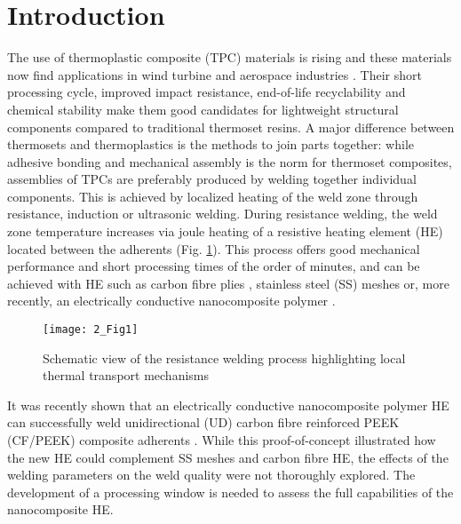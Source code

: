 \section{Introduction}

The use of thermoplastic composite (TPC) materials is rising \cite{Mathijsen2016} and these materials now find applications in wind turbine and aerospace industries \cite{Penumadu2019}. 
Their short processing cycle, improved impact resistance, end-of-life recyclability and chemical stability \cite{cogswell1992} make them good candidates for lightweight structural components compared to traditional thermoset resins. 
A major difference between thermosets and thermoplastics is the methods to join parts together: while adhesive bonding and mechanical assembly is the norm for thermoset composites, assemblies of TPCs are preferably produced by welding together individual components. 
This is achieved by localized heating of the weld zone through resistance, induction or ultrasonic welding. 
During resistance welding, the weld zone temperature increases via joule heating of a resistive heating element (HE) located between the adherents \cite{Ageorges2001a,Stavrov2005a,Dube2007c,Shi2014,Brassard2019a,Eveno1988} (Fig. \ref{fig:2_Fig1}). 
This process offers good mechanical performance and short processing times of the order of minutes, and can be achieved with HE such as carbon fibre plies \cite{Eveno1988}, stainless steel (SS) meshes \cite{Stavrov2005a,Dube2007c,Shi2014} or, more recently, an electrically conductive nanocomposite polymer \cite{Brassard2019a}. 

\begin{figure}[ht]
	\center
	\texttt{[image: 2\_Fig1]}
	\caption{Schematic view of the resistance welding process highlighting local thermal transport mechanisms \cite{Brassard2019b}}
	\label{fig:2_Fig1}
\end{figure} 

It was recently shown that an electrically conductive nanocomposite polymer HE can successfully weld unidirectional (UD) carbon fibre reinforced PEEK (CF/PEEK) composite adherents \cite{Brassard2019a}. 
While this proof-of-concept illustrated how the new HE could complement SS meshes and carbon fibre HE, the effects of the welding parameters on the weld quality were not thoroughly explored. 
The development of a processing window is needed to assess the full capabilities of the nanocomposite HE. 

